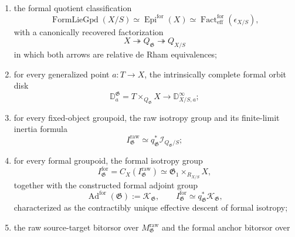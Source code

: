 \begin{theorem}
\begin{enumerate}
    quotient formalization
    \[
        P_q
        =
        Q\times_{Q_{\mathrm{dR}/S}}X_{\mathrm{dR}/S},
        \qquad
        X\twoheadrightarrow\widehat Q_q\hookrightarrow P_q,
    \]
    its right-adjoint coreflection, and the equivalent recognition criteria
    \[
    \begin{aligned}
        \check C_\bullet(q)\text{ formal}
        &\Longleftrightarrow
        q_{\mathrm{dR}/S}\text{ is a monomorphism}\\
        &\Longleftrightarrow
        q_{\mathrm{dR}/S}\text{ is an equivalence}\\
        &\Longleftrightarrow
        \widehat Q_q\xrightarrow{\sim}Q;
    \end{aligned}
    \]
    \item the formal quotient classification
    \[
        \operatorname{FormLieGpd}(X/S)
        \simeq
        \operatorname{Epi}^{\mathrm{for}}(X)
        \simeq
        \operatorname{Fact}^{\mathrm{for}}_{\mathrm{eff}}
        (\epsilon_{X/S}),
    \]
    with a canonically recovered factorization
    \[
        X\twoheadrightarrow Q_{\mathfrak G}
        \twoheadrightarrow Q_{X/S}
    \]
    in which both arrows are relative de Rham equivalences;
    \item for every generalized point $a:T\to X$, the intrinsically complete
    formal orbit disk
    \[
        \mathbb D^{\mathfrak G}_a
        =
        T\times_{Q_{\mathfrak G}}X
        \longrightarrow
        \mathbb D^\infty_{X/S,a};
    \]
    \item for every fixed-object groupoid, the raw isotropy group and its
    finite-limit inertia formula
    \[
        I^{\mathrm{raw}}_{\mathfrak G}
        \simeq
        q_{\mathfrak G}^*
        \mathcal I_{Q_{\mathfrak G}/S};
    \]
    \item for every formal groupoid, the formal isotropy group
    \[
        I^{\mathrm{for}}_{\mathfrak G}
        =
        C_X(I^{\mathrm{raw}}_{\mathfrak G})
        \simeq
        \mathfrak G_1\times_{R_{X/S}}X,
    \]
    together with the constructed formal adjoint group
    \[
        \operatorname{Ad}^{\mathrm{for}}(\mathfrak G)
        :=
        \mathcal K_{\mathfrak G},
        \qquad
        I^{\mathrm{for}}_{\mathfrak G}
        \simeq
        q_{\mathfrak G}^*\mathcal K_{\mathfrak G},
    \]
    characterized as the contractibly unique effective descent of formal
    isotropy;
    \item the raw source-target bitorsor over
    $M^{\mathrm{raw}}_{\mathfrak G}$ and the formal anchor bitorsor over

\end{enumerate}
\end{theorem}

